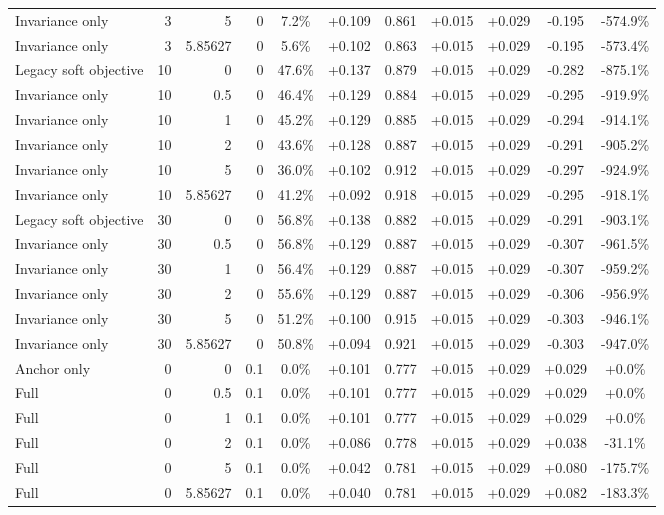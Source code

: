\begin{table}[htbp]
\begin{tabular}{lrrrccccccc}
Invariance only & 3 & 5 & 0 & 7.2\% & +0.109 & 0.861 & +0.015 & +0.029 & -0.195 & -574.9\% \\
Invariance only & 3 & 5.85627 & 0 & 5.6\% & +0.102 & 0.863 & +0.015 & +0.029 & -0.195 & -573.4\% \\
Legacy soft objective & 10 & 0 & 0 & 47.6\% & +0.137 & 0.879 & +0.015 & +0.029 & -0.282 & -875.1\% \\
Invariance only & 10 & 0.5 & 0 & 46.4\% & +0.129 & 0.884 & +0.015 & +0.029 & -0.295 & -919.9\% \\
Invariance only & 10 & 1 & 0 & 45.2\% & +0.129 & 0.885 & +0.015 & +0.029 & -0.294 & -914.1\% \\
Invariance only & 10 & 2 & 0 & 43.6\% & +0.128 & 0.887 & +0.015 & +0.029 & -0.291 & -905.2\% \\
Invariance only & 10 & 5 & 0 & 36.0\% & +0.102 & 0.912 & +0.015 & +0.029 & -0.297 & -924.9\% \\
Invariance only & 10 & 5.85627 & 0 & 41.2\% & +0.092 & 0.918 & +0.015 & +0.029 & -0.295 & -918.1\% \\
Legacy soft objective & 30 & 0 & 0 & 56.8\% & +0.138 & 0.882 & +0.015 & +0.029 & -0.291 & -903.1\% \\
Invariance only & 30 & 0.5 & 0 & 56.8\% & +0.129 & 0.887 & +0.015 & +0.029 & -0.307 & -961.5\% \\
Invariance only & 30 & 1 & 0 & 56.4\% & +0.129 & 0.887 & +0.015 & +0.029 & -0.307 & -959.2\% \\
Invariance only & 30 & 2 & 0 & 55.6\% & +0.129 & 0.887 & +0.015 & +0.029 & -0.306 & -956.9\% \\
Invariance only & 30 & 5 & 0 & 51.2\% & +0.100 & 0.915 & +0.015 & +0.029 & -0.303 & -946.1\% \\
Invariance only & 30 & 5.85627 & 0 & 50.8\% & +0.094 & 0.921 & +0.015 & +0.029 & -0.303 & -947.0\% \\
Anchor only & 0 & 0 & 0.1 & 0.0\% & +0.101 & 0.777 & +0.015 & +0.029 & +0.029 & +0.0\% \\
Full & 0 & 0.5 & 0.1 & 0.0\% & +0.101 & 0.777 & +0.015 & +0.029 & +0.029 & +0.0\% \\
Full & 0 & 1 & 0.1 & 0.0\% & +0.101 & 0.777 & +0.015 & +0.029 & +0.029 & +0.0\% \\
Full & 0 & 2 & 0.1 & 0.0\% & +0.086 & 0.778 & +0.015 & +0.029 & +0.038 & -31.1\% \\
Full & 0 & 5 & 0.1 & 0.0\% & +0.042 & 0.781 & +0.015 & +0.029 & +0.080 & -175.7\% \\
Full & 0 & 5.85627 & 0.1 & 0.0\% & +0.040 & 0.781 & +0.015 & +0.029 & +0.082 & -183.3\% \\

\end{tabular}
\end{table}
